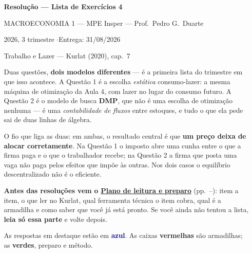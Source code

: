 \documentclass[11pt, a4paper]{article}
\newcommand{\resp}[1]{%
  \ifmmode {\color{darkblue}#1}\else\textcolor{darkblue}{\textbf{#1}}\fi}
\begin{document}
\begin{center}
{\LARGE\bfseries\color{darkblue} Resolução --- Lista de Exercícios 4\par}
\vspace{4pt}
{\large MACROECONOMIA 1 --- MPE Insper --- Prof.\ Pedro G.\ Duarte\par}
\vspace{2pt}
{\normalsize 2026, 3\textordmasculine{} trimestre \quad$\cdot$\quad Entrega: 31/08/2026\par}
\vspace{2pt}
{\small Trabalho e Lazer --- Kurlat (2020), cap.\ 7\par}
\end{center}
\vspace{6pt}

\begin{tcolorbox}[theorybox, title={Como ler este documento}]
\small
Duas questões, \textbf{dois modelos diferentes} --- é a primeira lista do trimestre em que
isso acontece. A Questão 1 é a escolha \emph{estática} consumo-lazer: a mesma máquina de
otimização da Aula 4, com lazer no lugar do consumo futuro. A Questão 2 é o modelo de
busca \textbf{DMP}, que não é uma escolha de otimização nenhuma --- é uma \emph{contabilidade
de fluxos} entre estoques, e tudo o que ela pede sai de duas linhas de álgebra.

\smallskip
O fio que liga as duas: em ambas, o resultado central é que \textbf{um preço deixa de
alocar corretamente}. Na Questão 1 o imposto abre uma cunha entre o que a firma paga e o
que o trabalhador recebe; na Questão 2 a firma que posta uma vaga não paga pelos efeitos
que impõe às outras. Nos dois casos o equilíbrio descentralizado não é o eficiente.

\smallskip
\textbf{Antes das resoluções vem o \hyperref[sec:plano]{Plano de leitura e preparo}}
(pp.\ \pageref{sec:plano}--\pageref{sec:fimplano}): item a item, o que ler no Kurlat, qual
ferramenta técnica o item cobra, qual é a armadilha e como saber que você já está pronto.
Se você ainda não tentou a lista, \textbf{leia só essa parte} e volte depois.

\smallskip
As respostas em destaque estão em \resp{azul}. As caixas
\textcolor{trapcolor}{\textbf{vermelhas}} são armadilhas; as
\textcolor{plancolor}{\textbf{verdes}}, preparo e método.
\end{tcolorbox}
\end{document}
